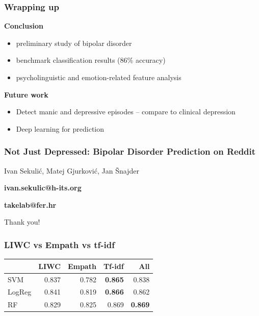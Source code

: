 \documentclass{beamer}
\begin{document}
\begin{frame}
  \frametitle{Wrapping up}
  \textbf{Conclusion}
  \begin{itemize}
    \item preliminary study of bipolar disorder 
    \item benchmark classification results (86\% accuracy)
    \item psycholinguistic and emotion-related feature analysis
  \end{itemize}

  \textbf{Future work}
  \begin{itemize}
    \item Detect manic and depressive episodes -- compare to clinical depression%
    \item Deep learning for prediction
  \end{itemize}
\end{frame}



\begin{frame}
  \frametitle{Not Just Depressed: Bipolar Disorder Prediction on Reddit}

  \centering
  Ivan Sekuli\'c, Matej Gjurkovi\'c, Jan \v{S}najder

  \vspace{4 mm} 

  \textbf{ivan.sekulic@h-its.org}

  \textbf{takelab@fer.hr}


\Huge{\centerline{Thank you!}}
\end{frame}

\begin{frame}[noframenumbering]
  \frametitle{LIWC vs Empath vs tf-idf}
\begin{table}[t]
\centering
{\small
\begin{tabular}{lrrrr}
\toprule
       & LIWC  & Empath & Tf-idf & All   \\ 
\midrule
SVM    & 0.837 & 0.782  & \textbf{0.865}  & 0.838 \\
LogReg & 0.841 & 0.819  & \textbf{0.866}  & 0.862 \\
RF     & 0.829 & 0.825  & 0.869  & \textbf{0.869} \\
\bottomrule
\end{tabular}}
\end{table}
\end{frame}
\end{document}
